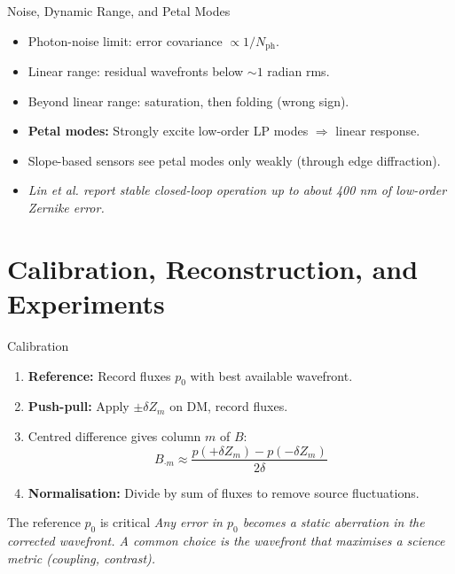 \documentclass[aspectratio=169,10pt]{beamer}
\begin{document}
\begin{frame}{Noise, Dynamic Range, and Petal Modes}
\begin{itemize}
    \item Photon-noise limit: error covariance \(\propto 1/N_{\mathrm{ph}}\).
    \item Linear range: residual wavefronts below \(\sim 1\) radian rms.
    \item Beyond linear range: saturation, then folding (wrong sign).
    \item \textbf{Petal modes:} Strongly excite low-order LP modes \(\Rightarrow\) linear response.
    \item Slope-based sensors see petal modes only weakly (through edge diffraction).
    \item \emph{Lin et al. report stable closed-loop operation up to about 400 nm of low-order Zernike error.}
\end{itemize}
\end{frame}

\section{Calibration, Reconstruction, and Experiments}
\begin{frame}{Calibration}
\begin{enumerate}
    \item \textbf{Reference:} Record fluxes \(p_0\) with best available wavefront.
    \item \textbf{Push-pull:} Apply \(\pm \delta Z_m\) on DM, record fluxes.
    \item Centred difference gives column \(m\) of \(B\):
    \[
        B_{\cdot m} \approx \frac{p(+\delta Z_m) - p(-\delta Z_m)}{2\delta}
    \]
    \item \textbf{Normalisation:} Divide by sum of fluxes to remove source fluctuations.
\end{enumerate}
\begin{block}{The reference $p_0$ is critical}
\emph{Any error in $p_0$ becomes a static aberration in the corrected wavefront. A common choice is the wavefront that maximises a science metric (coupling, contrast).}
\end{block}
\end{frame}
\end{document}
